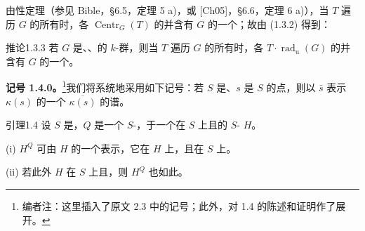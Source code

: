 由性定理（参见 Bible，\S 6.5，定理 5 a)，或 [Ch05]，\S 6.6，定理 6 a)），当 $T$ 遍历 $G$ 的所有时，各 $\operatorname{Centr}_G(T)$ 的并含有 $G$ 的一个；故由 (1.3.2) 得到：
\begin{SGAresult}{推论}{1.3.3}
若 $G$ 是、、的 $k$-群，则当 $T$ 遍历 $G$ 的所有时，各 $T\cdot\operatorname{rad}_{\mathrm u}(G)$ 的并含有 $G$ 的一个。
\end{SGAresult}
\textbf{记号 1.4.0。}\footnote[5]{编者注：这里插入了原文 2.3 中的记号；此外，对 1.4 的陈述和证明作了展开。}我们将系统地采用如下记号：若 $S$ 是、$s$ 是 $S$ 的点，则以 $\bar s$ 表示 $\kappa(s)$ 的一个 $\overline{\kappa(s)}$ 的谱。
\begin{SGAresult}{引理}{1.4}
设 $S$ 是，$Q$ 是一个 $S$-，于一个在 $S$ 上且的 $S$- $H$。\footnotemark[5]

(i)  $H^Q$ 可由 $H$ 的一个表示，它在 $H$ 上，且在 $S$ 上。

(ii) 若此外 $H$ 在 $S$ 上且，则 $H^Q$ 也如此。
\end{SGAresult}
